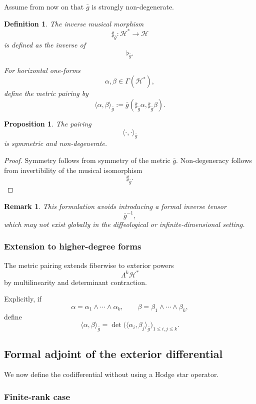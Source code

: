 \documentclass[11pt]{amsart}
\newtheorem{proposition}[theorem]{Proposition}
\newtheorem{definition}[theorem]{Definition}
\newtheorem{remark}[theorem]{Remark}
\begin{document}
Assume from now on that \(\bar g\) is strongly non-degenerate.

\begin{definition}
The inverse musical morphism
\[
\sharp_{\bar g}:
\mathcal H^*
\longrightarrow
\mathcal H
\]
is defined as the inverse of
\[
\flat_{\bar g}.
\]

For horizontal one-forms
\[
\alpha,\beta\in\Gamma(\mathcal H^*),
\]
define the metric pairing by
\[
\langle \alpha,\beta\rangle_{\bar g}
:=
\bar g(\sharp_{\bar g}\alpha,\sharp_{\bar g}\beta).
\]
\end{definition}

\begin{proposition}
The pairing
\[
\langle\cdot,\cdot\rangle_{\bar g}
\]
is symmetric and non-degenerate.
\end{proposition}

\begin{proof}
Symmetry follows from symmetry of the metric \(\bar g\). Non-degeneracy follows
from invertibility of the musical isomorphism
\[
\sharp_{\bar g}.
\]
\end{proof}

\begin{remark}
This formulation avoids introducing a formal inverse tensor
\[
\bar g^{-1},
\]
which may not exist globally in the diffeological or infinite-dimensional
setting.
\end{remark}

\subsubsection{Extension to higher-degree forms}

The metric pairing extends fiberwise to exterior powers
\[
\Lambda^k\mathcal H^*
\]
by multilinearity and determinant contraction.

Explicitly, if
\[
\alpha=\alpha_1\wedge\cdots\wedge\alpha_k,
\qquad
\beta=\beta_1\wedge\cdots\wedge\beta_k,
\]
define
\[
\langle\alpha,\beta\rangle_{\bar g}
=
\det\!\Big(
\langle\alpha_i,\beta_j\rangle_{\bar g}
\Big)_{1\leq i,j\leq k}.
\]

\subsection{Formal adjoint of the exterior differential}

We now define the codifferential without using a Hodge star operator.

\subsubsection{Finite-rank case}
\end{document}
